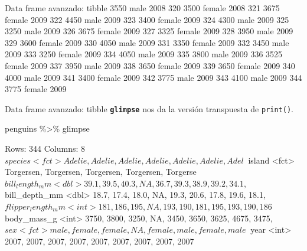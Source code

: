 \documentclass[
  ignorenonframetext,
  aspectratio=169]{beamer}
\newenvironment{Shaded}{\begin{snugshade}}{\end{snugshade}}
\newcommand{\NormalTok}[1]{#1}
\newcommand{\SpecialCharTok}[1]{\textcolor[rgb]{0.00,0.00,0.00}{#1}}
\let\oldverbatim\verbatim
\let\endoldverbatim\endverbatim
\renewenvironment{verbatim}{\tiny\oldverbatim}{\endoldverbatim}
\begin{document}
\begin{frame}[fragile]{Data frame avanzado: tibble}
\begin{verbatim}
319        3550   male 2008
320        3500 female 2008
321        3675 female 2009
322        4450   male 2009
323        3400 female 2009
324        4300   male 2009
325        3250   male 2009
326        3675 female 2009
327        3325 female 2009
328        3950   male 2009
329        3600 female 2009
330        4050   male 2009
331        3350 female 2009
332        3450   male 2009
333        3250 female 2009
334        4050   male 2009
335        3800   male 2009
336        3525 female 2009
337        3950   male 2009
338        3650 female 2009
339        3650 female 2009
340        4000   male 2009
341        3400 female 2009
342        3775   male 2009
343        4100   male 2009
344        3775 female 2009
\end{verbatim}
\end{frame}

\begin{frame}[fragile]{Data frame avanzado: tibble}
\protect\hypertarget{data-frame-avanzado-tibble-7}{}
\textbf{\texttt{glimpse}} nos da la versión transpuesta de
\texttt{print()}.

\hfill\break

\begin{Shaded}
\begin{Highlighting}[]
\NormalTok{penguins }\SpecialCharTok{\%\textgreater{}\%}\NormalTok{ glimpse}
\end{Highlighting}
\end{Shaded}

\begin{verbatim}
Rows: 344
Columns: 8
$ species           <fct> Adelie, Adelie, Adelie, Adelie, Adelie, Adelie, Adel~
$ island            <fct> Torgersen, Torgersen, Torgersen, Torgersen, Torgerse~
$ bill_length_mm    <dbl> 39.1, 39.5, 40.3, NA, 36.7, 39.3, 38.9, 39.2, 34.1, ~
$ bill_depth_mm     <dbl> 18.7, 17.4, 18.0, NA, 19.3, 20.6, 17.8, 19.6, 18.1, ~
$ flipper_length_mm <int> 181, 186, 195, NA, 193, 190, 181, 195, 193, 190, 186~
$ body_mass_g       <int> 3750, 3800, 3250, NA, 3450, 3650, 3625, 4675, 3475, ~
$ sex               <fct> male, female, female, NA, female, male, female, male~
$ year              <int> 2007, 2007, 2007, 2007, 2007, 2007, 2007, 2007, 2007~
\end{verbatim}
\end{frame}
\end{document}
